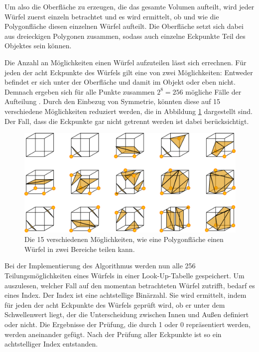 Um also die Oberfläche zu erzeugen, die das gesamte Volumen aufteilt, wird jeder Würfel zuerst einzeln betrachtet und es wird ermittelt, ob und wie die Polygonfläche diesen einzelnen Würfel aufteilt.  Die Oberfläche setzt sich dabei aus dreieckigen Polygonen zusammen, sodass auch einzelne Eckpunkte Teil des Objektes sein können.

Die Anzahl an Möglichkeiten einen Würfel aufzuteilen lässt sich errechnen. Für jeden der acht Eckpunkte des Würfels gilt eine von zwei Möglichkeiten: Entweder befindet er sich unter der Oberfläche und damit im Objekt oder eben nicht. Demnach ergeben sich für alle Punkte zusammen $2^8=256$ mögliche Fälle der Aufteilung \cite{aigner07}. Durch den Einbezug von Symmetrie, könnten diese auf 15 verschiedene Möglichkeiten reduziert werden, die in Abbildung \ref{img:marchingCubes} dargestellt sind. Der Fall, dass die Eckpunkte gar nicht getrennt werden ist dabei berücksichtigt. 

\begin{figure}[!htb]
	\centering
	\includegraphics[width=0.7\linewidth]{images/MarchingCubes.png}
	\caption{Die 15 verschiedenen Möglichkeiten, wie eine Polygonfläche einen Würfel in zwei Bereiche teilen kann.}
	\label{img:marchingCubes}
\end{figure}
\FloatBarrier

Bei der Implementierung des Algorithmus werden nun alle 256 Teilungsmöglichkeiten eines Würfels in einer Look-Up-Tabelle gespeichert. Um auszulesen, welcher Fall auf den momentan betrachteten Würfel zutrifft, bedarf es eines Index. 
Der Index ist eine achtstellige Binärzahl. Sie wird ermittelt, indem für jeden der acht Eckpunkte des Würfels geprüft wird, ob er unter dem Schwellenwert liegt, der die Unterscheidung zwischen Innen und Außen definiert oder nicht. Die Ergebnisse der Prüfung, die durch 1 oder 0 repräsentiert werden, werden aneinander gefügt. Nach der Prüfung aller Eckpunkte ist so ein achtstelliger Index entstanden. 

